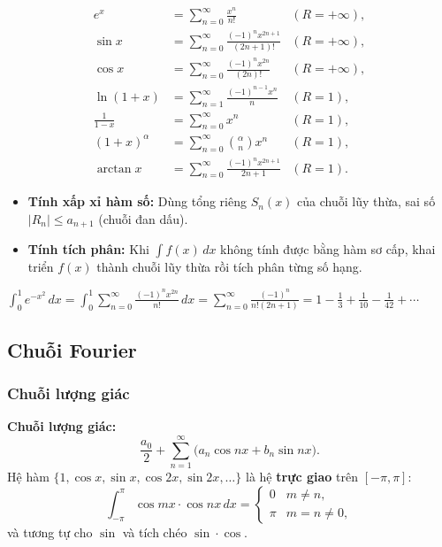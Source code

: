 \documentclass[12pt,a4paper]{article}
\begin{document}
\begin{congthuc}[title={Khai triển Maclaurin thường gặp (bán kính hội tụ)}]
  \begin{align*}
    e^x &= \sum_{n=0}^{\infty} \frac{x^n}{n!} & (R = +\infty), \\
    \sin x &= \sum_{n=0}^{\infty} \frac{(-1)^n x^{2n+1}}{(2n+1)!} & (R = +\infty), \\
    \cos x &= \sum_{n=0}^{\infty} \frac{(-1)^n x^{2n}}{(2n)!} & (R = +\infty), \\
    \ln(1+x) &= \sum_{n=1}^{\infty} \frac{(-1)^{n-1} x^n}{n} & (R = 1), \\
    \frac{1}{1-x} &= \sum_{n=0}^{\infty} x^n & (R = 1), \\
    (1+x)^\alpha &= \sum_{n=0}^{\infty} \binom{\alpha}{n} x^n & (R = 1), \\
    \arctan x &= \sum_{n=0}^{\infty} \frac{(-1)^n x^{2n+1}}{2n+1} & (R = 1).
  \end{align*}
\end{congthuc}

\begin{phuongphap}[title={Ứng dụng tính gần đúng}]
  \begin{itemize}
    \item \textbf{Tính xấp xỉ hàm số:} Dùng tổng riêng $S_n(x)$ của chuỗi lũy thừa, sai số $|R_n| \le a_{n+1}$ (chuỗi đan dấu).
    \item \textbf{Tính tích phân:} Khi $\displaystyle\int f(x)\,dx$ không tính được bằng hàm sơ cấp, khai triển $f(x)$ thành chuỗi lũy thừa rồi tích phân từng số hạng.
  \end{itemize}
\end{phuongphap}

\begin{vidu}
  $\displaystyle\int_0^1 e^{-x^2}\,dx = \int_0^1 \sum_{n=0}^{\infty} \frac{(-1)^n x^{2n}}{n!}\,dx = \sum_{n=0}^{\infty} \frac{(-1)^n}{n!(2n+1)} = 1 - \frac{1}{3} + \frac{1}{10} - \frac{1}{42} + \cdots$
\end{vidu}

\subsection{Chuỗi Fourier}

\subsubsection{Chuỗi lượng giác}

\begin{dinhnghia}
  \textbf{Chuỗi lượng giác:}
  \[
    \frac{a_0}{2} + \sum_{n=1}^{\infty} \bigl(a_n \cos nx + b_n \sin nx\bigr).
  \]
  Hệ hàm $\{1, \cos x, \sin x, \cos 2x, \sin 2x, \ldots\}$ là hệ \textbf{trực giao} trên $[-\pi, \pi]$:
  \[
    \int_{-\pi}^{\pi} \cos mx \cdot \cos nx\,dx = \begin{cases} 0 & m \ne n, \\ \pi & m = n \ne 0, \end{cases}
  \]
  và tương tự cho $\sin$ và tích chéo $\sin \cdot \cos$.
\end{dinhnghia}
\end{document}
